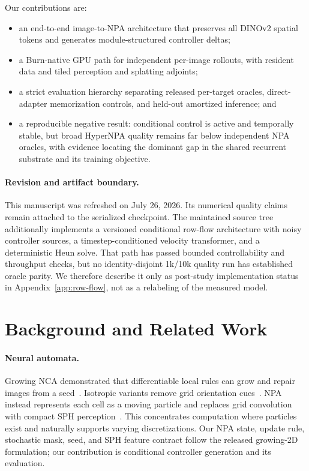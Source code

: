 \documentclass[sigconf,nonacm]{acmart}
\begin{document}
Our contributions are:
\begin{itemize}
  \item an end-to-end image-to-NPA architecture that preserves all DINOv2
  spatial tokens and generates module-structured controller deltas;
  \item a Burn-native GPU path for independent per-image rollouts, with
  resident data and tiled perception and splatting adjoints;
  \item a strict evaluation hierarchy separating released per-target oracles,
  direct-adapter memorization controls, and held-out amortized inference; and
  \item a reproducible negative result: conditional control is active and
  temporally stable, but broad HyperNPA quality remains far below independent
  NPA oracles, with evidence locating the dominant gap in the shared recurrent
  substrate and its training objective.
\end{itemize}

\paragraph{Revision and artifact boundary.}
This manuscript was refreshed on July 26, 2026. Its numerical quality claims
remain attached to the serialized
 checkpoint. The maintained source
tree additionally implements a versioned conditional row-flow architecture
with noisy controller sources, a timestep-conditioned velocity transformer,
and a deterministic Heun solve. That path has passed bounded controllability
and throughput checks, but no identity-disjoint 1k/10k quality run has
established oracle parity. We therefore describe it only as post-study
implementation status in Appendix~\ref{app:row-flow}, not as a relabeling of
the measured model.

\section{Background and Related Work}

\paragraph{Neural automata.}
Growing NCA demonstrated that differentiable local rules can grow and repair
images from a seed~\cite{mordvintsev2020growing}. Isotropic variants remove
grid orientation cues~\cite{mordvintsev2022isotropic}. NPA instead represents
each cell as a moving particle and replaces grid convolution with compact SPH
perception~\cite{kim2026npa}. This concentrates computation where particles
exist and naturally supports varying discretizations. Our NPA state, update
rule, stochastic mask, seed, and SPH feature contract follow the released
growing-2D formulation; our contribution is conditional controller generation
and its evaluation.
\end{document}

